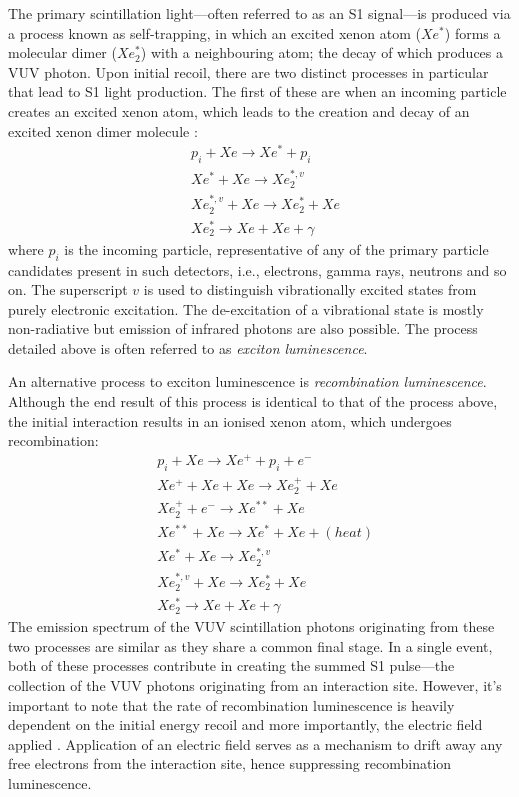 The primary scintillation light---often referred to as an S1 signal---is produced via a process known as self-trapping, in which an excited xenon atom ($Xe^{\ast}$) forms a molecular dimer ($Xe^{\ast}_{2}$) with a neighbouring atom; the decay of which produces a VUV photon. Upon initial recoil, there are two distinct processes in particular that lead to S1 light production. The first of these are when an incoming particle creates an excited xenon atom, which leads to the creation and decay of an excited xenon dimer molecule \cite{xenon_physics}:
%
\begin{align} \label{eq:exciton_luminescence}
    &p_{i} + Xe \rightarrow Xe^{\ast} + p_{i} \\
    &Xe^{\ast} + Xe \rightarrow Xe^{\ast, v}_{2} \\
    &Xe^{\ast, v}_{2} + Xe \rightarrow Xe^{\ast}_{2} + Xe \\
    &Xe^{\ast}_{2} \rightarrow  Xe +  Xe + \gamma
\end{align}
%
where $p_{i}$ is the incoming particle, representative of any of the primary particle candidates present in such detectors, i.e., electrons, gamma rays, neutrons and so on. The superscript $v$ is used to distinguish vibrationally excited states from purely electronic excitation. The de-excitation of a vibrational state is mostly non-radiative but emission of infrared photons are also possible. The process detailed above is often referred to as \textit{exciton luminescence}.

An alternative process to exciton luminescence is \textit{recombination luminescence}. Although the end result of this process is identical to that of the process above, the initial interaction results in an ionised xenon atom, which undergoes recombination:
%
\begin{align} \label{eq:recombination_luminescence}
    &p_{i} + Xe \rightarrow Xe^{+} + p_{i} + e^{-} \\
    &Xe^{+} + Xe + Xe \rightarrow Xe^{+}_{2} + Xe \\
    &Xe^{+}_{2} + e^{-} \rightarrow Xe^{\ast\ast} + Xe \\
    &Xe^{\ast\ast} + Xe \rightarrow Xe^{\ast} + Xe + (heat) \\
    &Xe^{\ast} + Xe \rightarrow Xe^{\ast, v}_{2} \\
    &Xe^{\ast, v}_{2} + Xe \rightarrow Xe^{\ast}_{2} + Xe \\
    &Xe^{\ast}_{2} \rightarrow  Xe +  Xe + \gamma
\end{align}
%
The emission spectrum of the VUV scintillation photons originating from these two processes are similar as they share a common final stage. In a single event, both of these processes contribute in creating the summed S1 pulse---the collection of the VUV photons originating from an interaction site. However, it's important to note that the rate of recombination luminescence is heavily dependent on the initial energy recoil and more importantly, the electric field applied \cite{Dahl}. Application of an electric field serves as a mechanism to drift away any free electrons from the interaction site, hence suppressing recombination luminescence. 

